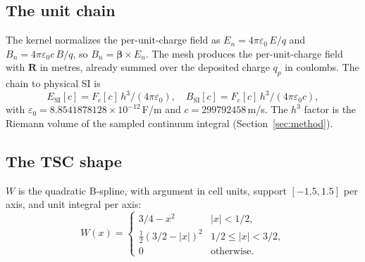 \subsection{The unit chain}

The kernel normalizes the per-unit-charge field as
$E_n = 4\pi\varepsilon_0\,E/q$ and $B_n = 4\pi\varepsilon_0 c\,B/q$, so
$B_n=\boldsymbol{\beta}\times E_n$. The mesh produces the per-unit-charge
field with $\mathbf{R}$ in metres, already summed over the deposited charge
$q_p$ in coulombs. The chain to physical SI is
\begin{equation}
E_{\mathrm{SI}}[c] = F_c[c]\,h^3/(4\pi\varepsilon_0),\quad
B_{\mathrm{SI}}[c] = F_c[c]\,h^3/(4\pi\varepsilon_0 c),
\end{equation}
with $\varepsilon_0=8.8541878128\times10^{-12}$\,F/m and
$c=299792458$\,m/s. The $h^3$ factor is the Riemann volume of the sampled
continuum integral (Section~\ref{sec:method}).

\subsection{The TSC shape}
\label{sec:tsc}

$W$ is the quadratic B-spline, with argument in cell units, support
$[-1.5,1.5]$ per axis, and unit integral per axis:
\begin{equation}
W(x) =
\begin{cases}
3/4 - x^2 & |x|<1/2,\\
\frac{1}{2}(3/2-|x|)^2 & 1/2\le |x|<3/2,\\
0 & \text{otherwise.}
\end{cases}
\end{equation}
